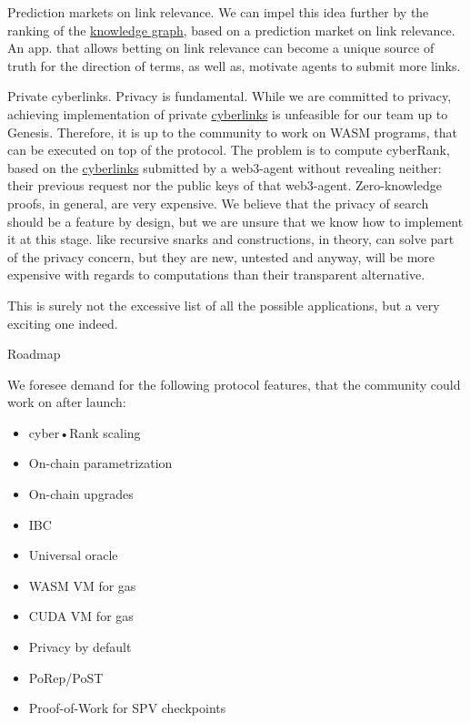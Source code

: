 \documentclass[8pt,oneside]{amsart}
\makeatletter
\newcommand{\linkgreen}[2]{\href{#1}{\color{green}{#2}}}
\renewcommand\subsection{\@startsection{subsection}
                                    {2}{\z@}
                                    {-3.25ex\@plus -1ex \@minus -.2ex}
                                    {0ex \@plus .2ex}
                                    {\play\Large}
                        }
\newcommand{\titleSection}[1]{\subsection{#1}}
\makeatother
\begin{document}
Prediction markets on link relevance. We can impel this idea further by the ranking of the {\hyperref[knowledge-graph]{knowledge graph}}, based on a prediction market on link relevance. An app. that allows betting on link relevance can become a unique source of truth for the direction of terms, as well as, motivate agents to submit more links.

Private cyberlinks. Privacy is fundamental. While we are committed to privacy, achieving implementation of private {\hyperref[cyberlinks]{cyberlinks}} is unfeasible for our team up to Genesis. Therefore, it is up to the community to work on WASM programs, that can be executed on top of the protocol. The problem is to compute cyberRank, based on the {\hyperref[cyberlinks]{cyberlinks}} submitted by a web3-agent without revealing neither: their previous request nor the public keys of that web3-agent. Zero-knowledge proofs, in general, are very expensive. We believe that the privacy of search should be a feature by design, but we are unsure that we know how to implement it at this stage. \linkgreen{https://ipfs.io/ipfs/Qmdje3AmtsfjX9edWAxo3LFhV9CTAXoUvwGR7wHJXnc2Gk}{Coda} like recursive snarks and \linkgreen{https://ipfs.io/ipfs/Qmd99xmraYip9cVv8gRMy6Y97Bkij8qUYArGDME7CzFasg}{MimbleWimble} constructions, in theory, can solve part of the privacy concern, but they are new, untested and anyway, will be more expensive with regards to computations than their transparent alternative.

This is surely not the excessive list of all the possible applications, but a very exciting one indeed.

\titleSection{Roadmap}\label{roadmap}

We foresee demand for the following protocol features, that the community could work on after launch:

\begin{itemize}
\item cyber•Rank scaling
\item On-chain parametrization
\item On-chain upgrades
\item IBC
\item Universal oracle
\item WASM VM for gas
\item CUDA VM for gas
\item Privacy by default
\item PoRep/PoST
\item Proof-of-Work for SPV checkpoints

\end{itemize}
\end{document}
